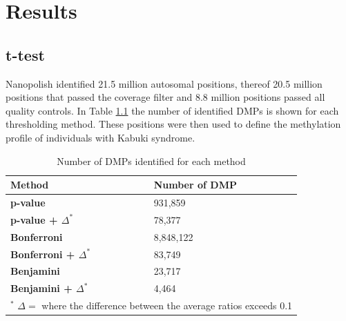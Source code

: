 \chapter{Results}
\section{t-test}
Nanopolish identified 21.5 million autosomal positions, thereof 20.5 million positions that passed the coverage filter and 8.8 million positions passed all quality controls. In Table \ref{table:signif_summary} the number of identified DMPs is shown for each thresholding method. These positions were then used to define the methylation profile of individuals with Kabuki syndrome.
\begin {table}
    \caption{Number of DMPs identified for each method}
    \begin{center}
        \begin{tabular}{p{5cm}p{5cm}} 
            \hline
             \textbf{Method} & \textbf{Number of DMP} \\
             \hline
             \hline
             \textbf{p-value} & 931,859 \\ 
             \textbf{p-value + $\Delta^*$} & 78,377 \\
             \textbf{Bonferroni} & 8,848,122\\ 
             \textbf{Bonferroni + $\Delta^*$} & 83,749 \\ 
             \textbf{Benjamini} & 23,717\\
             \textbf{Benjamini + $\Delta^*$} & 4,464 \\
             \hline            
             \multicolumn{2}{c}{             $^*$ $\Delta =$ where the difference between the average ratios exceeds 0.1} \\
        \end{tabular}
    \label{table:signif_summary}
    \end{center}
\end{table}




